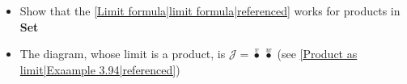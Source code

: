 
\begin{itemize}
    \item  Show that the \ref{Limit formula|limit formula|referenced} works for products in \textbf{Set}
    \item The diagram, whose limit is a product, is $\mathcal{J}=\boxed{\overset{v}\bullet\ \overset{w}\bullet}$ (see \ref{Product as limit|Exaample 3.94|referenced})
  \end{itemize}